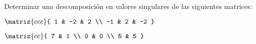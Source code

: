 \begin{enunciado}{\ejercicio}
  Determinar una descomposición en valores singulares de las siguientes matrices:
  \begin{enumerate}[label=(\alph*)]
    \begin{multicols}{2}
      \item
      $\matriz{ccc}{
          1 & -2 & 2 \\
          -1 & 2 & -2
        }$

      \item
      $\matriz{cc}{
          7 & 1 \\
          0 & 0  \\
          5 & 5
        }
      $
    \end{multicols}
  \end{enumerate}
\end{enunciado}

